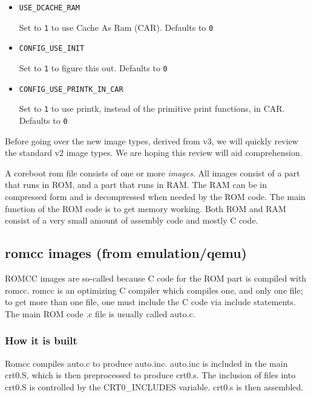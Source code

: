 \documentclass[titlepage,12pt]{article}
\begin{document}
\begin{itemize}
\item \begin{verbatim}USE_DCACHE_RAM\end{verbatim}

Set to \texttt{1} to use Cache As Ram (CAR). Defaults to \texttt{0}

\item \begin{verbatim}CONFIG_USE_INIT\end{verbatim}

Set to \texttt{1} to figure this out. Defaults to \texttt{0}

\item \begin{verbatim}CONFIG_USE_PRINTK_IN_CAR\end{verbatim}

Set to \texttt{1} to use printk, instead of the primitive print functions, in CAR. Defaults to \texttt{0}

\end{itemize}

Before going over the new image types, derived from v3, we will quickly review the standard v2 image types. We are hoping this review will
aid comprehension. 

A coreboot rom file consists of one or more \textit{images}. All images consist of a part that runs in ROM, and a part that runs in RAM. The RAM can be in  compressed form and is decompressed when needed by the ROM code. The main function of the ROM code is to get memory working. Both ROM and RAM consist of a very small amount of assembly code and mostly C code. 

\subsection{romcc images (from emulation/qemu)}
ROMCC images are so-called because C code for the ROM part is compiled with romcc. romcc is an optimizing C compiler which compiles one, and only 
one file; to get more than one file, one must include the C code via include statements. The main ROM code .c file is usually called auto.c. 
\subsubsection{How it is built}
Romcc compiles auto.c to produce auto.inc. auto.inc is included in the main crt0.S, which is then preprocessed to produce crt0.s. The inclusion of files into crt0.S is controlled by the CRT0\_INCLUDES variable. crt0.s is then assembled. 
\end{document}
